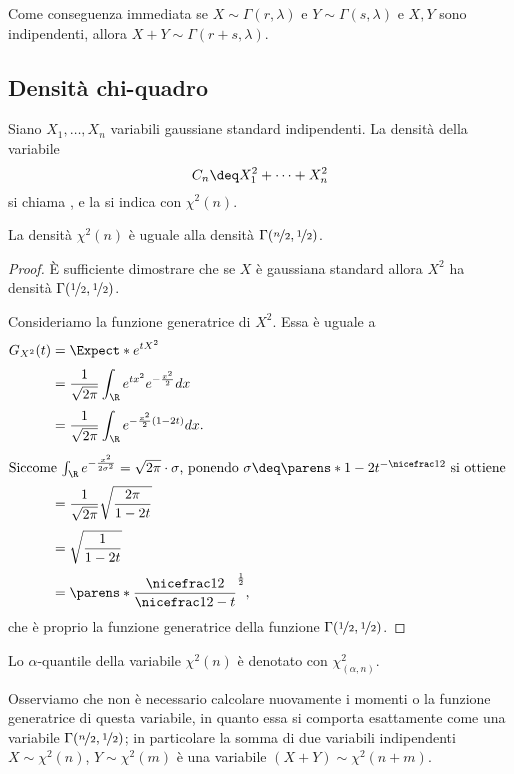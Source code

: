 Come conseguenza immediata se $X \sim \Gamma(r, \lambda)$ e $Y \sim \Gamma(s, \lambda)$ e $X, Y$ sono indipendenti, allora $X + Y \sim \Gamma(r + s, \lambda)$.

\subsection{Densità chi-quadro}

\begin{definition}
    Siano $X_1, \dots, X_n$ variabili gaussiane standard indipendenti. La densità della variabile \[
        C_n \deq X_1^2 + \dots + X_n^2    
    \] si chiama , e la si indica con $\chi^2(n)$.
\end{definition}

\begin{proposition}
    La densità $\chi^2(n)$ è uguale alla densità $\Gamma(\nicefrac{n}{2}, \nicefrac{1}{2})$.
\end{proposition}
\begin{proof}
    È sufficiente dimostrare che se $X$ è gaussiana standard allora $X^2$ ha densità $\Gamma(\nicefrac{1}{2}, \nicefrac{1}{2})$.

    Consideriamo la funzione generatrice di $X^2$. Essa è uguale a \begin{align*}
        G_{X^2}(t) &= \Expect*{e^{tX^2}}\\[3pt]
        &= \frac{1}{\sqrt{2\pi}} \int_\R e^{tx^2}e^{-\frac{x^2}{2}} dx\\[3pt]
        &= \frac{1}{\sqrt{2\pi}} \int_\R e^{-\frac{x^2}{2}(1 - 2t)} dx.\\[3pt]
        \intertext{Siccome $\int_\R e^{-\frac{x^2}{2\sigma^2}} = \sqrt{2\pi} \cdot \sigma$, ponendo $\sigma \deq \parens*{1 - 2t}^{-\nicefrac12}$ si ottiene }
        &= \frac{1}{\sqrt{2\pi}} \sqrt{\frac{2\pi}{1-2t}}\\[3pt]
        &= \sqrt{\frac{1}{1-2t}}\\[3pt]
        &= \parens*{\frac{\nicefrac12}{\nicefrac12 - t}}^\frac12,
    \end{align*} che è proprio la funzione generatrice della funzione $\Gamma(\nicefrac{1}{2}, \nicefrac12)$.
\end{proof}

Lo $\alpha$-quantile della variabile $\chi^2(n)$ è denotato con $\chi^2_{(\alpha, n)}$.

Osserviamo che non è necessario calcolare nuovamente i momenti o la funzione generatrice di questa variabile, in quanto essa si comporta esattamente come una variabile $\Gamma(\nicefrac{n}{2}, \nicefrac12)$; in particolare la somma di due variabili indipendenti $X \sim \chi^2(n)$, $Y \sim \chi^2(m)$ è una variabile $(X + Y) \sim \chi^2(n + m)$.

